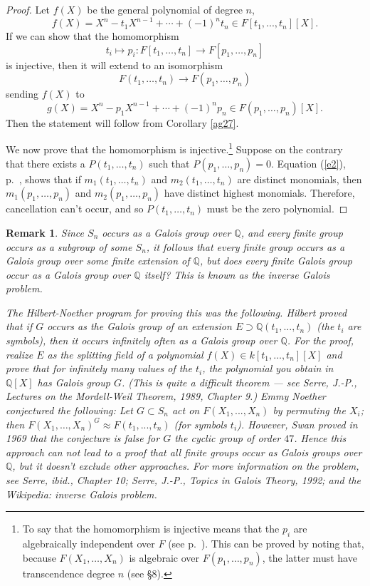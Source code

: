 \documentclass[a4paper,11pt,final,openany]{memoir}
\newtheorem{remark}[X]{Remark}
\theoremstyle{nonumberplain}
\newtheorem{proof}{Proof.}
\begin{document}
\begin{proof}
Let $f(X)$ be the general polynomial of degree $n$,
\[
f(X)=X^{n}-t_{1}X^{n-1}+\cdots+(-1)^{n}t_{n}\in F[t_{1},...,t_{n}][X].
\]
If we can show that the homomorphism
\[
t_{i}\mapsto p_{i}\colon F[t_{1},\ldots,t_{n}]\rightarrow F[p_{1},\ldots
,p_{n}]
\]
is injective, then it will extend to an isomorphism%
\[
F(t_{1},\ldots,t_{n})\rightarrow F(p_{1},\ldots,p_{n})
\]
sending $f(X)$ to%
\[
g(X)=X^{n}-p_{1}X^{n-1}+\cdots+(-1)^{n}p_{n}\in F(p_{1},\ldots,p_{n})[X].
\]
Then the statement will follow from Corollary \ref{ag27}.

We now prove that the homomorphism is injective.\footnote{To say that the
homomorphism is injective means that the $p_{i}$ are algebraically independent
over $F$ (see p.~\pageref{ai}). This can be proved by noting that, because
$F(X_{1},\ldots,X_{n})$ is algebraic over $F(p_{1},\ldots,p_{n})$, the latter
must have transcendence degree $n$ (see \S 8).} Suppose on the contrary that
there exists a $P(t_{1},\ldots,t_{n})$ such that $P(p_{1},\ldots,p_{n})=0$.
Equation (\ref{e2}), p.~\pageref{e2}, shows that if $m_{1}(t_{1},\ldots
,t_{n})$ and $m_{2}(t_{1},\ldots,t_{n})$ are distinct monomials, then
$m_{1}(p_{1},\ldots,p_{n})$ and $m_{2}(p_{1},\ldots,p_{n})$ have distinct
highest monomials. Therefore, cancellation can't occur, and so $P(t_{1}%
,\ldots,t_{n})$ must be the zero polynomial.
\end{proof}

\begin{remark}
\label{ag30}Since $S_{n}$ occurs as a Galois group over $\mathbb{Q}$, and
every finite group occurs as a subgroup of some $S_{n}$, it follows that every
finite group occurs as a Galois group over some finite extension of
$\mathbb{Q}$, but does every finite Galois group occur as a Galois group over
$\mathbb{Q}$ itself? This is known as the inverse Galois problem.

The Hilbert-Noether program for proving this was the following. Hilbert proved
that if $G$ occurs as the Galois group of an extension $E\supset
\mathbb{Q}(t_{1},...,t_{n})$ (the $t_{i}$ are symbols), then it occurs
infinitely often as a Galois group over $\mathbb{Q}$. For the proof, realize
$E$ as the splitting field of a polynomial $f(X)\in k[t_{1},\ldots,t_{n}][X]$
and prove that for infinitely many values of the $t_{i}$, the polynomial you
obtain in $\mathbb{Q}[X]$ has Galois group $G$. (This is quite a difficult
theorem --- see Serre, J.-P., \textit{Lectures on the Mordell-Weil
Theorem,}\emph{\/} 1989, Chapter 9.) Emmy Noether conjectured the following:
Let $G\subset S_{n}$ act on $F(X_{1},...,X_{n})$ by permuting the $X_{i}$;
then $F(X_{1},\ldots,X_{n})^{G}\approx F(t_{1},...,t_{n})$ (for symbols
$t_{i}$). However, Swan proved in 1969 that the conjecture is false for $G$
the cyclic group of order $47$. Hence this approach can not lead to a proof
that all finite groups occur as Galois groups over $\mathbb{Q}$, but it
doesn't exclude other approaches. For more information on the problem, see
Serre, ibid., Chapter 10; Serre, J.-P., \textit{Topics in Galois Theory},
1992; and the Wikipedia: inverse Galois problem.
\end{remark}
\end{document}
